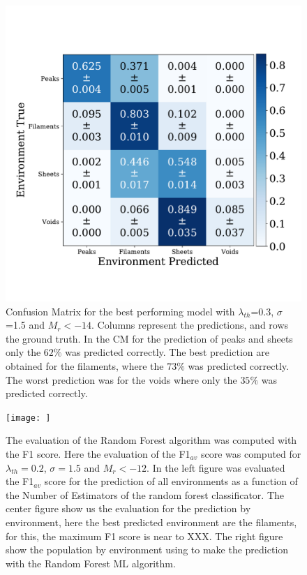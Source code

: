 \documentclass[usenatbib]{mnras}
\begin{document}
\begin{figure}
\centering
    \includegraphics[scale=0.4]{Figs/p_confusion_matrix_21.pdf}
    \caption{Confusion Matrix for the best performing model with $\lambda_{th}$=0.3, $\sigma$=1.5 and $M_{r}<-14$. Columns represent the predictions, and rows the ground truth. In the CM for the prediction of peaks and sheets only the $62\%$ was predicted correctly. The best prediction are obtained for the filaments, where the $73\%$ was predicted correctly. The worst prediction was for the voids where only the $35\%$ was predicted correctly.}
    \label{fig:confusion_matrix}    
\end{figure}

\begin{figure}
    \texttt{[image: ]}
    \caption{The evaluation of the Random Forest algorithm was computed with the F1 score. Here the evaluation of the F1$_{av}$ score was computed for $\lambda_{th}=0.2$, $\sigma=1.5$ and $M_r<-12$.  In the left figure was evaluated the F1$_{av}$ score for the prediction of all environments as a function of the Number of Estimators of the random forest classificator. The center figure show us the evaluation for the prediction by environment, here the best predicted environment are the filaments, for this, the maximum F1 score is near to XXX. The right figure show the population by environment using to make the prediction with the Random Forest ML algorithm.}
    \label{fig:F1_curve}
\end{figure}
\end{document}
